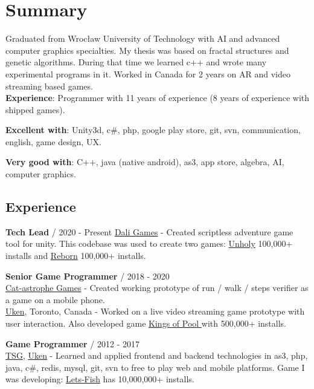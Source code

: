 \documentclass[12pt,a4paper]{article}
\begin{document}
\begin{multicols}{2}


\centering
\section*{Summary}
\justifying
	\noindent Graduated from Wrocław University of Technology with AI and advanced computer graphics specialties. My thesis was based on fractal structures and genetic algorithms. During that time we learned c++ and wrote many experimental programs in it. Worked in Canada for 2 years on AR and video streaming based games. \\

	\textbf{Experience}: Programmer with 11 years of experience (8 years of experience with shipped games).
	
	\textbf{Excellent with}: Unity3d, c\#, php, google play store, git, svn, communication, english, game design, UX.
	
	\textbf{Very good with}: C++, java (native android), as3, app store, algebra, AI, computer graphics.

\begin{samepage}
\centering
\section*{Experience }
\justifying

	\textbf{Tech Lead} / 2020 - Present
		{\href{https://dali.games/}{Dali Games}} - Created scriptless adventure game tool for unity. This codebase was used to create two games: {\href{https://play.google.com/store/apps/details?id=games.dali.adventure.neighborhood.unholy}{Unholy}} 100,000+ installs and {\href{https://play.google.com/store/apps/details?id=games.dali.adventure.reborn}{Reborn}} 100,000+ installs. 

	\textbf{Senior Game Programmer} / 2018 - 2020\\
		{\href{https://cat-astrophe-games.com/}{Cat-astrophe Games}} - Created working prototype of run / walk / steps verifier as a game on a mobile phone. \\
		{\href{https://www.uken.com/}{Uken}}, Toronto, Canada  - Worked on a live video streaming game prototype with user interaction. Also developed game {\href{https://play.google.com/store/apps/details?id=com.uken.pool}{Kings of Pool }} with  500,000+ installs. 

	\textbf{Game Programmer} / 2012 - 2017\\ 
		{\href{https://tensquaregames.com/}{TSG}}, {\href{https://www.uken.com/}{Uken}} - Learned and applied frontend and backend technologies in as3, php, java, c\#, redis, mysql, git, svn to free to play web and mobile platforms. Game I was developing: {\href{https://play.google.com/store/apps/details?id=air.com.tensquaregames.letsfish}{Lets-Fish}} has 10,000,000+ installs.


\end{samepage}
\end{multicols}
\end{document}

